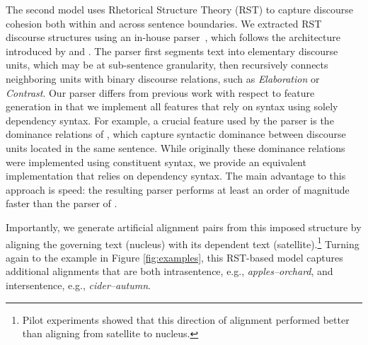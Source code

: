 The second model uses Rhetorical Structure Theory (RST) to capture discourse cohesion both within and across sentence boundaries.  
We extracted RST discourse structures using an in-house parser~\citep{Surdeanu:15}, which follows the architecture introduced by \citet{hernault10} and \citet{feng12}.
The parser first segments text into elementary discourse units, which may be at sub-sentence granularity, then recursively connects neighboring units with binary discourse relations, such as \emph{Elaboration} or \emph{Contrast}.
Our parser differs from previous work with respect to feature generation in that we implement all features that rely on syntax using solely dependency syntax. For example, a crucial feature used by the parser is the dominance relations of \citet{soricut2003}, which capture syntactic dominance between discourse units located in the same sentence. While originally these dominance relations were implemented using constituent syntax, we provide an equivalent implementation that relies on dependency syntax. The main advantage to this approach is speed: the resulting parser performs at least an order of magnitude faster than the parser of \citet{feng12}. 

Importantly, we generate artificial alignment pairs from this imposed structure by aligning the governing text (nucleus) with its dependent text (satellite).\footnote{Pilot experiments showed that this direction of alignment performed better than aligning from satellite to nucleus.} 
 Turning again to the example in Figure \ref{fig:examples}, this RST-based model captures additional alignments that are both intrasentence, e.g., \emph{apples--orchard}, and intersentence, e.g., {\em cider--autumn}. 

